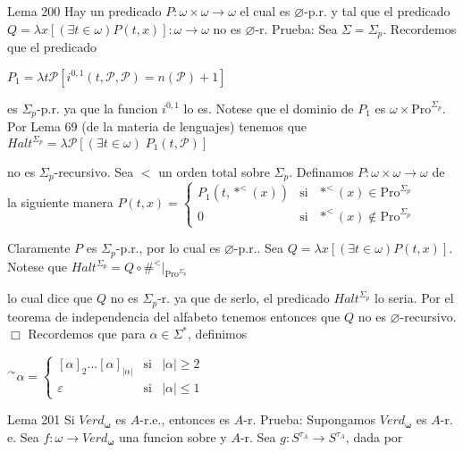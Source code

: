 Lema 200 Hay un predicado \(P:\omega \times \omega \rightarrow \omega \) el cual es \(\varnothing \)-p.r. y tal que el predicado \(Q=\lambda x \left[ (\exists t\in \omega )P(t,x)\right] :\omega \rightarrow \omega \) no es \(\varnothing \)-r.
Prueba: Sea \(\Sigma =\Sigma _{p}\). Recordemos que el predicado

\(\displaystyle P_{1}=\lambda t\mathcal{P}\left[ i^{0,1}(t,\mathcal{P},\mathcal{P})=n( \mathcal{P})+1\right] \)

es \(\Sigma _{p}\)-p.r. ya que la funcion \(i^{0,1}\) lo es. Notese que el dominio de \(P_{1}\) es \(\omega \times \mathrm{Pro}^{\Sigma _{p}}\). Por Lema 69 (de la materia de lenguajes) tenemos que
\(\displaystyle Halt^{\Sigma _{p}}=\lambda \mathcal{P}\left[ (\exists t\in \omega )\;P_{1}(t, \mathcal{P})\right] \)

no es \(\Sigma _{p}\)-recursivo. Sea \(< \) un orden total sobre \(\Sigma _{p}\). Definamos \(P:\omega \times \omega \rightarrow \omega \) de la siguiente manera
\(\displaystyle P(t,x)=\left\{ \begin{array}{ccc} P_{1}(t,\ast ^{< }(x)) & \text{si} & \ast ^{< }(x)\in \mathrm{Pro}^{\Sigma _{p}} \\ 0 & \text{si} & \ast ^{< }(x)\notin \mathrm{Pro}^{\Sigma _{p}} \end{array} \right. \)

Claramente \(P\) es \(\Sigma _{p}\)-p.r., por lo cual es \(\varnothing \)-p.r.. Sea \( Q=\lambda x\left[ (\exists t\in \omega )P(t,x)\right] .\) Notese que
\(\displaystyle Halt^{\Sigma _{p}}=Q\circ \#^{< }\mathrm{\mid }_{\mathrm{Pro}^{\Sigma _{p}}} \)

lo cual dice que \(Q\) no es \(\Sigma _{p}\)-r. ya que de serlo, el predicado \( Halt^{\Sigma _{p}}\) lo seria. Por el teorema de independencia del alfabeto tenemos entonces que \(Q\) no es \(\varnothing \)-recursivo. \(\Box\)
Recordemos que para \(\alpha \in \Sigma ^{\ast }\), definimos

\(\displaystyle ^{\curvearrowright }\alpha =\left\{ \begin{array}{lll} \left[ \alpha \right] _{2}...\left[ \alpha \right] _{\left\vert \alpha \right\vert } & \text{si} & \left\vert \alpha \right\vert \geq 2 \\ \varepsilon & \text{si} & \left\vert \alpha \right\vert \leq 1 \end{array} \right. \)

Lema 201 Si \(Verd_{\mathbf{\omega }}\) es \(A\)-r.e., entonces es \(A\)-r.
Prueba: Supongamos \(Verd_{\mathbf{\omega }}\) es \(A\)-r. e. Sea \(f:\omega \rightarrow Verd_{\mathbf{\omega }}\) una funcion sobre y \(A\)-r. Sea \(g:S^{\tau _{A}}\rightarrow S^{\tau _{A}}\), dada por

